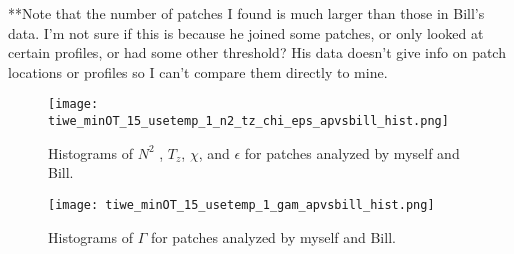 \documentclass[11pt]{article}
\begin{document}
**Note that the number of patches I found is much larger than those in Bill's data. I'm not sure if this is because he joined some patches, or only looked at certain profiles, or had some other threshold? His data doesn't give info on patch locations or profiles so I can't compare them directly to mine.

\begin{figure}[htbp]
\texttt{[image: tiwe\_minOT\_15\_usetemp\_1\_n2\_tz\_chi\_eps\_apvsbill\_hist.png]}
\caption{Histograms of $N^2$ , $T_z$, $\chi$, and $\epsilon$ for patches analyzed by myself and Bill.}
\label{comp_bill_ap_1}
\end{figure}
%

\begin{figure}[htbp]
\texttt{[image: tiwe\_minOT\_15\_usetemp\_1\_gam\_apvsbill\_hist.png]}
\caption{Histograms of $\Gamma$ for patches analyzed by myself and Bill.}
\label{comp_bill_ap_gam}
\end{figure}






%
%
%
%
%
%
%
%
\end{document}
